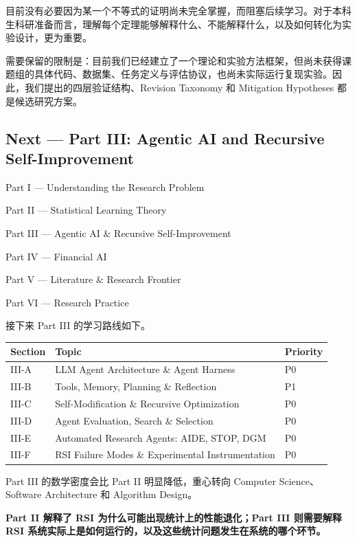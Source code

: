 目前没有必要因为某一个不等式的证明尚未完全掌握，而阻塞后续学习。对于本科生科研准备而言，理解每个定理能够解释什么、不能解释什么，以及如何转化为实验设计，更为重要。

需要保留的限制是：目前我们已经建立了一个理论和实验方法框架，但尚未获得课题组的具体代码、数据集、任务定义与评估协议，也尚未实际运行复现实验。因此，我们提出的四层验证结构、Revision Taxonomy 和 Mitigation Hypotheses 都是候选研究方案。

\hypertarget{part-2-27-0001-next-part-iii-agentic-ai-and-recursive-self-improvement}{%
\subsection{Next --- Part III: Agentic AI and Recursive Self-Improvement}\label{part-2-27-0001-next-part-iii-agentic-ai-and-recursive-self-improvement}}

Part I --- Understanding the Research Problem

Part II --- Statistical Learning Theory

Part III --- Agentic AI \& Recursive Self-Improvement

Part IV --- Financial AI

Part V --- Literature \& Research Frontier

Part VI --- Research Practice

接下来 Part III 的学习路线如下。

\begin{readertable}
\begin{longtable}[]{@{}
  >{\raggedright\arraybackslash}p{}
  >{\raggedright\arraybackslash}p{}
  >{\raggedright\arraybackslash}p{}@{}}
\toprule
Section & Topic & Priority \\
\midrule
\endhead
III-A & LLM Agent Architecture \& Agent Harness & P0 \\
III-B & Tools, Memory, Planning \& Reflection & P1 \\
III-C & Self-Modification \& Recursive Optimization & P0 \\
III-D & Agent Evaluation, Search \& Selection & P0 \\
III-E & Automated Research Agents: AIDE, STOP, DGM & P0 \\
III-F & RSI Failure Modes \& Experimental Instrumentation & P0 \\
\bottomrule
\end{longtable}
\end{readertable}

Part III 的数学密度会比 Part II 明显降低，重心转向 Computer Science、Software Architecture 和 Algorithm Design。

\textbf{Part II 解释了 RSI 为什么可能出现统计上的性能退化；Part III 则需要解释 RSI 系统实际上是如何运行的，以及这些统计问题发生在系统的哪个环节。}
